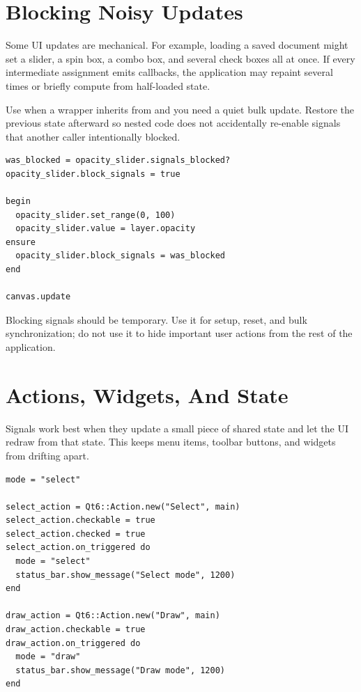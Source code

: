 \section{Blocking Noisy Updates}

Some UI updates are mechanical. For example, loading a saved document might set a slider, a spin box, a combo box, and several check boxes all at once. If every intermediate assignment emits callbacks, the application may repaint several times or briefly compute from half-loaded state.

Use  when a wrapper inherits from  and you need a quiet bulk update. Restore the previous state afterward so nested code does not accidentally re-enable signals that another caller intentionally blocked.

\begin{lstlisting}[style=crystal]
was_blocked = opacity_slider.signals_blocked?
opacity_slider.block_signals = true

begin
  opacity_slider.set_range(0, 100)
  opacity_slider.value = layer.opacity
ensure
  opacity_slider.block_signals = was_blocked
end

canvas.update
\end{lstlisting}

Blocking signals should be temporary. Use it for setup, reset, and bulk synchronization; do not use it to hide important user actions from the rest of the application.

\section{Actions, Widgets, And State}

Signals work best when they update a small piece of shared state and let the UI redraw from that state. This keeps menu items, toolbar buttons, and widgets from drifting apart.

\begin{lstlisting}[style=crystal]
mode = "select"

select_action = Qt6::Action.new("Select", main)
select_action.checkable = true
select_action.checked = true
select_action.on_triggered do
  mode = "select"
  status_bar.show_message("Select mode", 1200)
end

draw_action = Qt6::Action.new("Draw", main)
draw_action.checkable = true
draw_action.on_triggered do
  mode = "draw"
  status_bar.show_message("Draw mode", 1200)
end
\end{lstlisting}


